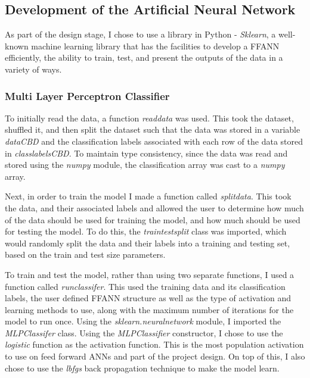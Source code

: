 \documentclass[11pt]{article}
\begin{document}
\subsection{Development of the Artificial Neural Network}\label{subsec:devANN}
As part of the design stage, I chose to use a library in Python - \textit{Sklearn}, a well-known machine learning library that has the facilities to develop a FFANN efficiently, the ability to train, test, and present the outputs of the data in a variety of ways. 
\subsubsection{Multi Layer Perceptron Classifier}\label{subsubsec:MLP}
To initially read the data, a function \textit{read\textunderscore data} was used. This took the dataset, shuffled it, and then split the dataset such that the data was stored in a variable \textit{data\textunderscore CBD} and the classification labels associated with each row of the data stored in \textit{class\textunderscore labels\textunderscore CBD}. To maintain type consistency, since the data was read and stored using the \textit{numpy} module, the classification array was cast to a \textit{numpy} array. 

Next, in order to train the model I made a function called \textit{split\textunderscore data}. This took the data, and their associated labels and allowed the user to determine how much of the data should be used for training the model, and how much should be used for testing the model. To do this, the \textit{train\textunderscore test\textunderscore split} class was imported, which would randomly split the data and their labels into a training and testing set, based on the train and test size parameters. 

To train and test the model, rather than using two separate functions, I used a function called \textit{run\textunderscore classifer}. This used the training data and its classification labels, the user defined FFANN structure as well as the type of activation and learning methods to use, along with the maximum number of iterations for the model to run once. Using the \textit{sklearn.neural\textunderscore network} module, I imported the \textit{MLPClassifer} class. Using the \textit{MLPClassifier} constructor, I chose to use the \textit{logistic} function as the activation function. This is the most population activation to use on feed forward ANNs and part of the project design. On top of this,  I also chose to use the \textit{lbfgs} back propagation technique to make the model learn.
\end{document}
